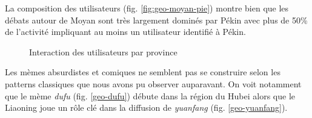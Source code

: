 La composition des utilisateurs (fig. \ref{fig:geo-moyan-pie}) montre bien que les débats autour de Moyan sont très largement dominés par Pékin avec plus de 50\% de l{\textquoteright}activité impliquant au moins un utilisateur identifié \`a Pékin.

\begin{figure}[htbp]
    \centering
    \caption{
        Interaction des utilisateurs par province
    }
\end{figure}


Les mèmes absurdistes et comiques ne semblent pas se construire selon les patterns classiques que nous avons pu observer auparavant. On voit notamment que le mème \textit{dufu } (fig. \ref{geo-dufu}) débute dans la région du Hubei alors que le Liaoning joue un r\^ole clé dans la diffusion de \textit{yuanfang} (fig. \ref{geo-yuanfang}). 


